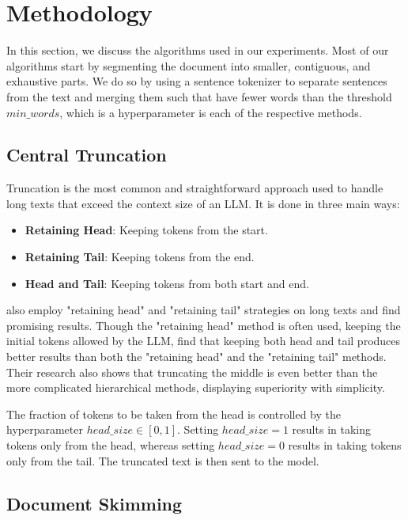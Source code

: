 \section{Methodology}
	\label{sec:methodology}

	In this section, we discuss the algorithms used in our experiments.
	Most of our algorithms start by segmenting the document into smaller, contiguous, and
	exhaustive parts.
	We do so by using a sentence tokenizer to separate sentences from the text and merging
	them such that have fewer words than the threshold $min\_words$, which is a hyperparameter
	is each of the respective methods.


	\subsection{Central Truncation}
		\label{method:truncation}

		Truncation is the most common and straightforward approach used to handle long texts
		that exceed the context size of an LLM.
		It is done in three main ways:

		\begin{itemize}
			\item \textbf{Retaining Head}: Keeping tokens from the start.
			\item \textbf{Retaining Tail}: Keeping tokens from the end.
			\item \textbf{Head and Tail}: Keeping tokens from both start and end.
		\end{itemize}

		\citet{worsham-kalita-2018-genre} also employ "retaining head" and "retaining tail"
		strategies on long texts and find promising results.
		Though the "retaining head" method is often used, keeping the initial tokens allowed by
		the LLM, \citet{sun2019fine} find that keeping both head and tail produces better results
		than both the "retaining head" and the "retaining tail" methods.
		Their research also shows that truncating the middle is even better than the more
		complicated hierarchical methods, displaying superiority with simplicity.

		The fraction of tokens to be taken from the head is controlled by the hyperparameter $head\_size
		\in [0, 1]$.
		Setting $head\_size = 1$ results in taking tokens only from the head, whereas setting $head\_size
		= 0$ results in taking tokens only from the tail.
		The truncated text is then sent to the model.


	\subsection{Document Skimming}
		\label{method:skimming}

